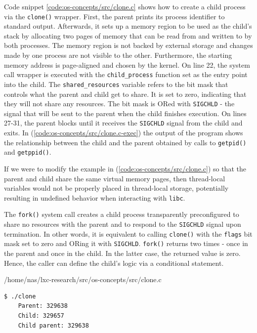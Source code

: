 Code snippet \ref{code:os-concepts/src/clone.c} shows how to create a child process via 
the \verb|clone()| wrapper. First, the parent prints its process identifier to standard output. 
Afterwards, it sets up a memory region to be used as the child's stack by allocating 
two pages of memory that can be read from and written to by both processes.
The memory region is not backed by external storage and changes made by one process are not visible to the other.
Furthermore, the starting memory address is page-aligned and chosen by the kernel.
On line 22, the system call wrapper is executed with the \verb|child_process| function set as the entry point into the child. 
The \verb|shared_resources| variable refers to the 
bit mask that controls what the parent and child get to share. It is set to zero, indicating that 
they will not share any resources. The bit mask is ORed with \verb|SIGCHLD| - the signal 
that will be sent to the parent when the child finishes execution. On lines 27-31, the 
parent blocks until it receives the \verb|SIGCHLD| signal  from the child and exits.
In (\ref{code:os-concepts/src/clone.c-exec}) the output of the program shows the 
relationship between the child and the parent obtained by calls to \verb|getpid()| and \verb|getppid()|. 

If we were to modify the example in (\ref{code:os-concepts/src/clone.c}) so that the parent and child share the same virtual memory pages,
then thread-local variables would not be properly 
placed in thread-local storage, potentially 
resulting in undefined behavior when interacting with \verb|libc|.

The \verb|fork()| system call creates a child process transparently preconfigured to share 
no resources with the parent and to respond to the \verb|SIGCHLD| signal upon termination.
In other words, it is equivalent to calling \verb|clone()| with the \verb|flags| bit mask set to 
zero and ORing it with \verb|SIGCHLD|. \verb|fork()| returns two times - once in the parent and once in the child. In the latter 
case, the returned value is zero. Hence, the caller can define the child's logic via a conditional 
statement.


{/home/nas/lxc-research/src/os-concepts/src/clone.c}
\begin{lstlisting}[label={code:os-concepts/src/clone.c-exec}, style=bash, caption={os-concepts/src/clone.c output}]
    $ ./clone 
    Parent: 329638
    Child: 329657
    Child parent: 329638
\end{lstlisting}

